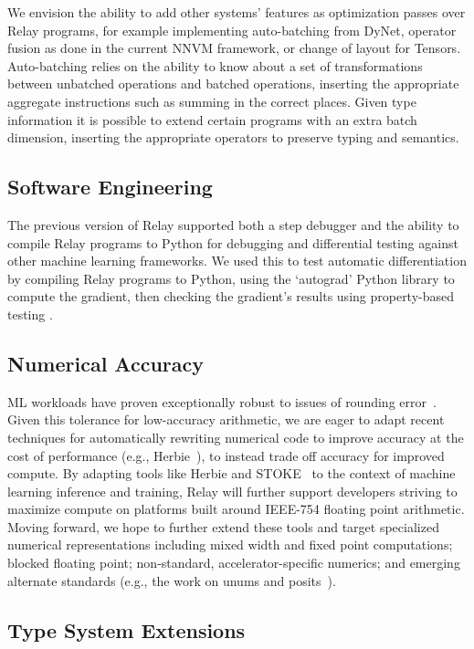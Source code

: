We envision the ability to add other systems' features as optimization passes
over Relay programs, for example implementing auto-batching from DyNet\cite{dynet},
operator fusion as done in the current NNVM framework, or change of layout for Tensors.
Auto-batching relies on the ability to know about a set of transformations between
unbatched operations and batched operations, inserting the appropriate aggregate
instructions such as summing in the correct places. Given type information
it is possible to extend certain programs with an extra batch dimension,
inserting the appropriate operators to preserve typing and semantics.

\subsection{Software Engineering}

The previous version of Relay supported both a step debugger and the
ability to compile Relay programs to Python for debugging and differential
testing against other machine learning frameworks. We used this to
test automatic differentiation by compiling Relay programs to Python,
using the `autograd' Python library to compute the gradient,
then checking the gradient's results using property-based
testing \cite{quickcheck}.

\subsection{Numerical Accuracy}

ML workloads have proven exceptionally robust to issues of rounding
error~\cite{ml-rounding-error}. Given this tolerance for low-accuracy
arithmetic, we are eager to adapt recent techniques for automatically
rewriting numerical code to improve accuracy at the cost of performance
(e.g., Herbie~\cite{herbie}), to instead trade off accuracy for improved
compute. By adapting tools like Herbie and STOKE~\cite{stoke-fp}
to the context of machine learning inference and training, Relay
will further support developers striving to maximize compute on
platforms built around IEEE-754 floating point arithmetic.  Moving
forward, we hope to further extend these tools and target
specialized numerical representations including mixed width
and fixed point computations; blocked floating point; non-standard,
accelerator-specific numerics; and emerging alternate standards
(e.g., the work on unums and posits~\cite{posits}).

\subsection{Type System Extensions}

